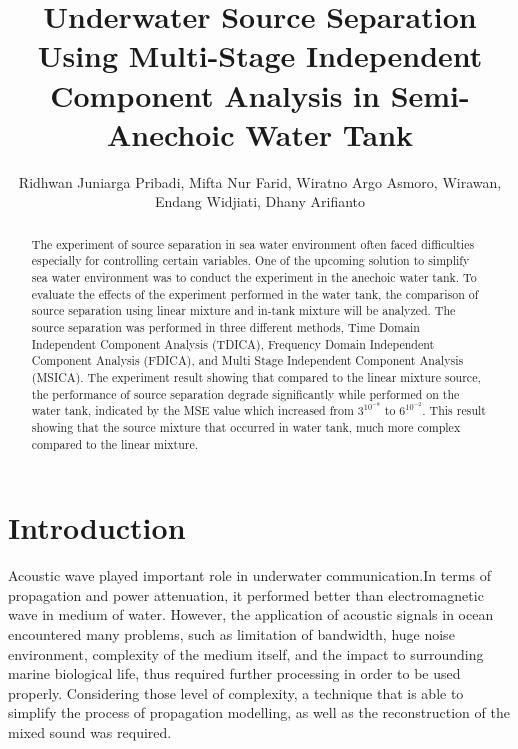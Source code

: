 \documentclass[a4paper]{jpconf}
\begin{document}
\title{Underwater Source Separation Using Multi-Stage Independent Component Analysis in Semi-Anechoic Water Tank}

\author{Ridhwan Juniarga Pribadi, Mifta Nur Farid, Wiratno Argo Asmoro, Wirawan, Endang Widjiati, Dhany Arifianto}

\address{Dept. of Engineering Physics, Faculty of Industrial Technology, Institut Teknologi Sepuluh Nopember, Kampus ITS Sukolilo, Surabaya 60111, Indonesia}


\begin{abstract}
The experiment of source separation in sea water environment often faced difficulties especially for controlling certain variables. One of the upcoming solution to simplify sea water environment was to conduct the experiment in the anechoic water tank. To evaluate the effects of the experiment performed in the water tank, the comparison of source separation using linear mixture and in-tank mixture will be analyzed. The source separation was performed in three different methods, Time Domain Independent Component Analysis (TDICA), Frequency Domain Independent Component Analysis (FDICA), and Multi Stage Independent Component Analysis (MSICA). The experiment result showing that compared to the linear mixture source, the performance of source separation degrade significantly while performed on the water tank, indicated by the MSE value which increased from $3^10^{-8}$ to $6^10^{-2}$. This result showing that the source mixture that occurred in water tank, much more complex compared to the linear mixture.
\end{abstract}

\section{Introduction}
Acoustic wave played important role in underwater communication.In terms of propagation and power attenuation, it performed better than electromagnetic wave in medium of water. However, the application of acoustic signals in ocean encountered many problems, such as limitation of bandwidth, huge noise environment, complexity of the medium itself, and the impact to surrounding marine biological life, thus required further processing in order to be used properly. Considering those level of complexity, a technique that is able to simplify the process of propagation modelling, as well as the reconstruction of the mixed sound was required.
\end{document}
